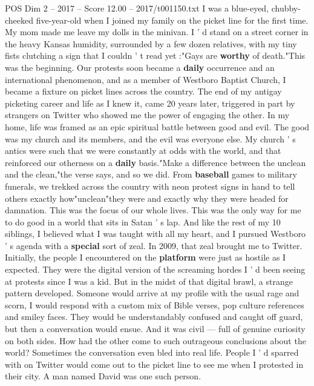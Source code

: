 \begin{textsample}{POS Dim 2 – 2017 – Score 12.00 – 2017/t001150.txt}  \label{ex:f2_pos_048}
I was a blue-eyed, chubby-cheeked five-year-old when I joined my family on the picket line for the first time.
My mom made me leave my dolls in the minivan.
I ' d stand on a street corner in the heavy Kansas humidity, surrounded by a few dozen relatives, with my tiny fists clutching a sign that I couldn ' t read yet :"Gays are \textbf{worthy} of death."This was the beginning.
Our protests soon became a \textbf{daily} occurrence and an international phenomenon, and as a member of Westboro Baptist Church, I became a fixture on picket lines across the country.
The end of my antigay picketing career and life as I knew it, came 20 years later, triggered in part by strangers on Twitter who showed me the power of engaging the other.
In my home, life was framed as an epic spiritual battle between good and evil.
The good was my church and its members, and the evil was everyone else.
My church ' s antics were such that we were constantly at odds with the world, and that reinforced our otherness on a \textbf{daily} basis."Make a difference between the unclean and the clean,"the verse says, and so we did.
From \textbf{baseball} games to military funerals, we trekked across the country with neon protest signs in hand to tell others exactly how"unclean"they were and exactly why they were headed for damnation.
This was the focus of our whole lives.
This was the only way for me to do good in a world that sits in Satan ' s lap.
And like the rest of my 10 siblings, I believed what I was taught with all my heart, and I pursued Westboro ' s agenda with a \textbf{special} sort of zeal.
In 2009, that zeal brought me to Twitter.
Initially, the people I encountered on the \textbf{platform} were just as hostile as I expected.
They were the digital version of the screaming hordes I ' d been seeing at protests since I was a kid.
But in the midst of that digital brawl, a strange pattern developed.
Someone would arrive at my profile with the usual rage and scorn, I would respond with a custom mix of Bible verses, pop culture references and smiley faces.
They would be understandably confused and caught off guard, but then a conversation would ensue.
And it was civil — full of genuine curiosity on both sides.
How had the other come to such outrageous conclusions about the world?
Sometimes the conversation even bled into real life.
People I ' d sparred with on Twitter would come out to the picket line to see me when I protested in their city.
A man named David was one such person.

\end{textsample}
